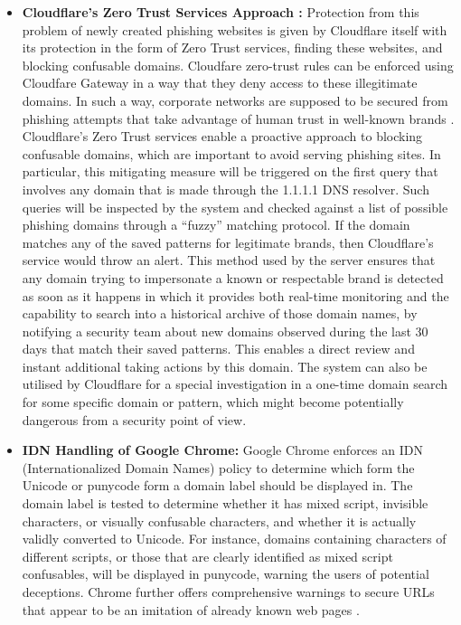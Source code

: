 \begin{itemize}
    \item \textbf{Cloudflare's Zero Trust Services Approach :} Protection from this problem of newly created phishing websites is given by Cloudflare itself with its protection in the form of Zero Trust services, finding these websites, and blocking confusable domains. Cloudfare zero-trust rules can be enforced using Cloudfare Gateway in a way that they deny access to these illegitimate domains. In such a way, corporate networks are supposed to be secured from phishing attempts that take advantage of human trust in well-known brands \cite{Cloudflare2023}. Cloudflare's Zero Trust services enable a proactive approach to blocking confusable domains, which are important to avoid serving phishing sites. In particular, this mitigating measure will be triggered on the first query that involves any domain that is made through the 1.1.1.1 DNS resolver. Such queries will be inspected by the system and checked against a list of possible phishing domains through a “fuzzy” matching protocol. If the domain matches any of the saved patterns for legitimate brands, then Cloudflare's service would throw an alert. This method used by the server ensures that any domain trying to impersonate a known or respectable brand is detected as soon as it happens in which it provides both real-time monitoring and the capability to search into a historical archive of those domain names, by notifying a security team about new domains observed during the last 30 days that match their saved patterns. This enables a direct review and instant additional taking actions by this domain. The system can also be utilised by Cloudflare for a special investigation in a one-time domain search for some specific domain or pattern, which might become potentially dangerous from a security point of view.

     \item \textbf{IDN Handling of Google Chrome: } Google Chrome enforces an IDN (Internationalized Domain Names) policy to determine which form the Unicode or punycode form a domain label should be displayed in. The domain label is tested to determine whether it has mixed script, invisible characters, or visually confusable characters, and whether it is actually validly converted to Unicode. For instance, domains containing characters of different scripts, or those that are clearly identified as mixed script confusables, will be displayed in punycode, warning the users of potential deceptions. Chrome further offers comprehensive warnings to secure URLs that appear to be an imitation of already known web pages \cite{ChromiumIDN}.
     
\end{itemize}

